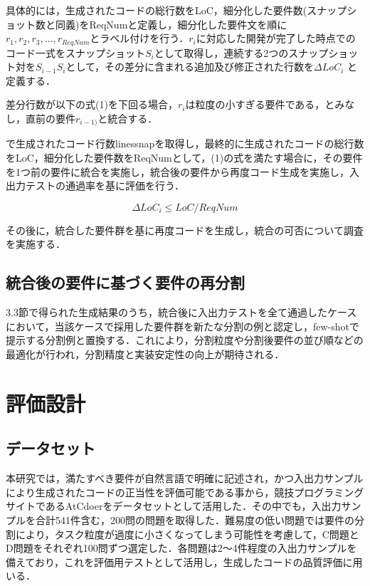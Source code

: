 \documentclass[submit,techrep,noauthor]{ipsj}
\begin{document}
具体的には，生成されたコードの総行数をLoC，細分化した要件数(スナップショット数と同義)をReqNumと定義し，細分化した要件文を順に $r_1, r_2, r_3,\dots,r_{ReqNum}$とラベル付けを行う．$r_i$に対応した開発が完了した時点でのコード一式をスナップショット$S_i$として取得し，連続する2つのスナップショット対を$S_{i-1}S_i$として，その差分に含まれる追加及び修正された行数を$\Delta LoC_i$ と定義する．

差分行数が以下の式(1)を下回る場合，$r_i$は粒度の小すぎる要件である，とみなし，直前の要件$r_{i-1)}$と統合する．

で生成されたコード行数linessnapを取得し，最終的に生成されたコードの総行数をLoC，細分化した要件数をReqNumとして，(1)の式を満たす場合に，その要件を1つ前の要件に統合を実施し，統合後の要件から再度コード生成を実施し，入出力テストの通過率を基に評価を行う．

\begin{equation}
    \Delta LoC_i \leq LoC / ReqNum
\end{equation}

その後に，統合した要件群を基に再度コードを生成し，統合の可否について調査を実施する．

\subsection{統合後の要件に基づく要件の再分割}
3.3節で得られた生成結果のうち，統合後に入出力テストを全て通過したケースにおいて，当該ケースで採用した要件群を新たな分割の例と認定し，few-shotで提示する分割例と置換する．これにより，分割粒度や分割後要件の並び順などの最適化が行われ，分割精度と実装安定性の向上が期待される．



\section{評価設計}
\subsection{データセット}
本研究では，満たすべき要件が自然言語で明確に記述され，かつ入出力サンプルにより生成されたコードの正当性を評価可能である事から，競技プログラミングサイトであるAtCdoerをデータセットとして活用した．その中でも，入出力サンプルを合計541件含む，200問の問題を取得した．難易度の低い問題では要件の分割により，タスク粒度が過度に小さくなってしまう可能性を考慮して，C問題とD問題をそれぞれ100問ずつ選定した．各問題は2〜4件程度の入出力サンプルを備えており，これを評価用テストとして活用し，生成したコードの品質評価に用いる．
\end{document}

